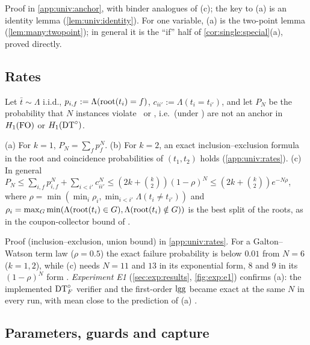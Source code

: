 \noindent Proof in \cref{app:univ:anchor}, with binder analogues of (c); the key to (a) is an identity lemma (\cref{lem:univ:identity}). For one variable, (a) is the two-point lemma (\cref{lem:many:twopoint}); in general it is the ``if'' half of \cref{cor:single:special}(a), proved directly.

\subsection{Rates}\label{sec:univ:rates}

Let $\bar t\sim\Lambda$ i.i.d., $p_{i,f}:=\Lambda(\mathrm{root}(t_i)=f)$, $c_{ii'}:=\Lambda(t_i=t_{i'})$, and let $P_N$ be the probability that $N$ instances violate \evR\ or \evD, i.e.\ (under \univRich) are not an anchor in $H_{1}(\mathrm{FO})$ or $H_{1}(\mathrm{DT}^{\circ})$.

\begin{theorem}\label{thm:univ:rates}
\textup{(a)} For $k=1$, $P_N=\sum_fp_f^N$.
\textup{(b)} For $k=2$, an exact inclusion--exclusion formula in the root and coincidence probabilities of $(t_1,t_2)$ holds (\cref{app:univ:rates}).
\textup{(c)} In general $P_N\le\sum_{i,f}p_{i,f}^N+\sum_{i<i'}c_{ii'}^N\le(2k+\binom k2)(1-\rho)^N\le(2k+\binom k2)e^{-N\rho}$, where $\rho=\min(\min_i\rho_i,\min_{i<i'}\Lambda(t_i\neq t_{i'}))$ and $\rho_i=\max_G\min(\Lambda(\mathrm{root}(t_i)\in G),\Lambda(\mathrm{root}(t_i)\notin G))$ is the best split of the roots, as in the coupon-collector bound of \citet{claude2026whatfollows}.
\end{theorem}

\noindent Proof (inclusion--exclusion, union bound) in \cref{app:univ:rates}. For a Galton--Watson term law ($\rho=0.5$) the exact failure probability is below $0.01$ from $N=6$ ($k=1,2$), while (c) needs $N=11$ and $13$ in its exponential form, $8$ and $9$ in its $(1-\rho)^N$ form . \emph{Experiment E1} (\cref{sec:exp:results}, \cref{fig:exp:e1}) confirms (a): the implemented $\mathrm{DT}^{\circ}_{F}$ verifier and the first-order $\mathrm{lgg}$ became exact at the same $N$ in every run, with mean close to the prediction of (a) .

\subsection{Parameters, guards and capture}\label{sec:univ:capture}

